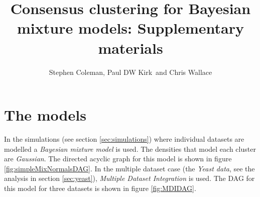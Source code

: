 \documentclass[]{article}
\title{Consensus clustering for Bayesian mixture models: Supplementary materials}
\author{Stephen Coleman, Paul DW Kirk\, and Chris Wallace}
\begin{document}
\maketitle

\begin{abstract}

\end{abstract}



\section{The models} \label{sec:models}
In the simulations (see section \ref{sec:simulations}) where individual datasets are modelled a \emph{Bayesian mixture model} is used. The densities that model each cluster are \emph{Gaussian}. The directed acyclic graph for this model is shown in figure \ref{fig:simpleMixNormalsDAG}. In the multiple dataset case (the \emph{Yeast data}, see the analysis in section \ref{sec:yeast}), \emph{Multiple Dataset Integration} \citep{kirk2012bayesian} is used. The DAG for this model for three datasets is shown in figure \ref{fig:MDIDAG}.
\end{document}
